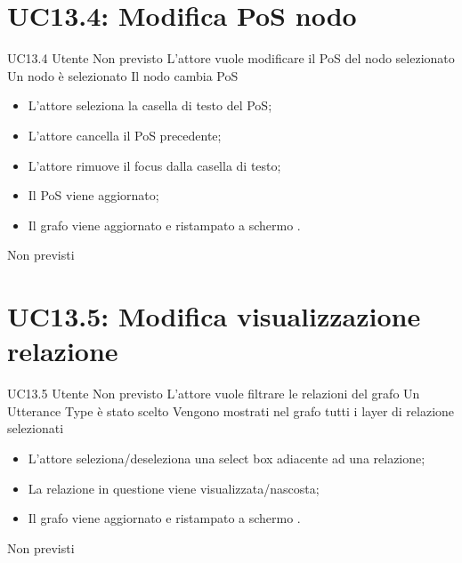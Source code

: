 \documentclass[../AnalisideiRequisiti.tex]{subfiles}
\begin{document}
\section{UC13.4: Modifica PoS nodo}
\UserCase
{UC13.4}
{Utente}
{Non previsto}
{L'attore vuole modificare il PoS del nodo selezionato}
{Un nodo è selezionato }
{Il nodo cambia PoS}
{
	\begin{itemize}
		\item{} L'attore seleziona la casella di testo del PoS;
		\item{} L'attore cancella il PoS precedente;
		\item{} L'attore rimuove il focus dalla casella di testo;
		\item{} Il PoS viene aggiornato;
		\item{} Il grafo viene aggiornato e ristampato a schermo .
	\end{itemize}
}
{Non previsti}

\section{UC13.5: Modifica visualizzazione relazione}
\UserCase
{UC13.5}
{Utente}
{Non previsto}
{L'attore vuole filtrare le relazioni del grafo}
{Un Utterance Type è stato scelto }
{Vengono mostrati nel grafo tutti i layer di relazione selezionati}
{
	\begin{itemize}
		\item{} L'attore seleziona/deseleziona una select box adiacente ad una relazione;
		\item{} La relazione in questione viene visualizzata/nascosta;
		\item{} Il grafo viene aggiornato e ristampato a schermo .
	\end{itemize}
}
{Non previsti}
\end{document}
